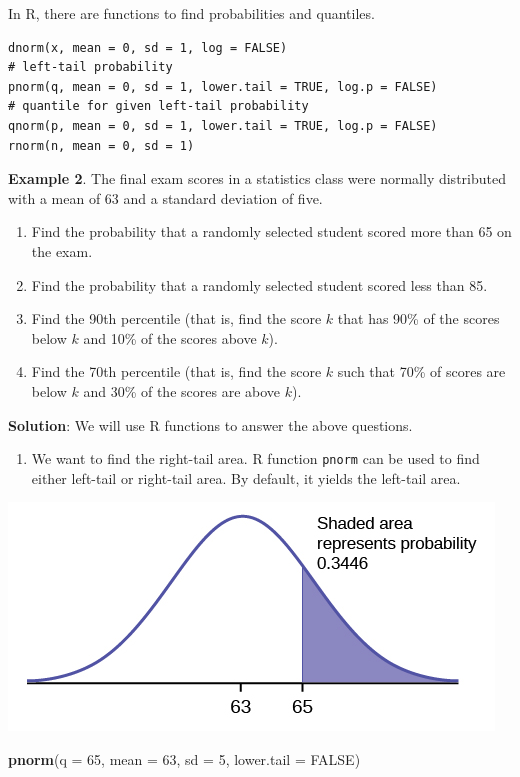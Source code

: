 \documentclass[
]{book}
\newenvironment{Shaded}{\begin{snugshade}}{\end{snugshade}}
\newcommand{\AttributeTok}[1]{\textcolor[rgb]{0.13,0.29,0.53}{#1}}
\newcommand{\ConstantTok}[1]{\textcolor[rgb]{0.56,0.35,0.01}{#1}}
\newcommand{\DecValTok}[1]{\textcolor[rgb]{0.00,0.00,0.81}{#1}}
\newcommand{\FunctionTok}[1]{\textcolor[rgb]{0.13,0.29,0.53}{\textbf{#1}}}
\newcommand{\NormalTok}[1]{#1}
\providecommand{\tightlist}{%
  \setlength{\itemsep}{0pt}\setlength{\parskip}{0pt}}
\begin{document}
In R, there are functions to find probabilities and quantiles.

\begin{verbatim}
dnorm(x, mean = 0, sd = 1, log = FALSE)
# left-tail probability
pnorm(q, mean = 0, sd = 1, lower.tail = TRUE, log.p = FALSE)   
# quantile for given left-tail probability
qnorm(p, mean = 0, sd = 1, lower.tail = TRUE, log.p = FALSE)   
rnorm(n, mean = 0, sd = 1)
\end{verbatim}

\textbf{Example 2}. The final exam scores in a statistics class were normally distributed with a mean of 63 and a standard deviation of five.

\begin{enumerate}
\def\labelenumi{\arabic{enumi}.}
\item
  Find the probability that a randomly selected student scored more than 65 on the exam.
\item
  Find the probability that a randomly selected student scored less than 85.
\item
  Find the 90th percentile (that is, find the score \(k\) that has 90\% of the scores below \(k\) and 10\% of the scores above \(k\)).
\item
  Find the 70th percentile (that is, find the score \(k\) such that 70\% of scores are below \(k\) and 30\% of the scores are above \(k\)).
\end{enumerate}

\textbf{Solution}: We will use R functions to answer the above questions.

\begin{enumerate}
\def\labelenumi{\arabic{enumi}.}
\tightlist
\item
  We want to find the right-tail area. R function \texttt{pnorm} can be used to find either left-tail or right-tail area. By default, it yields the left-tail area.
\end{enumerate}

\begin{center}\includegraphics[width=0.4\linewidth]{topic03/exmple5-1} \end{center}

\begin{Shaded}
\begin{Highlighting}[]
\FunctionTok{pnorm}\NormalTok{(}\AttributeTok{q =} \DecValTok{65}\NormalTok{, }\AttributeTok{mean =} \DecValTok{63}\NormalTok{, }\AttributeTok{sd =} \DecValTok{5}\NormalTok{, }\AttributeTok{lower.tail =} \ConstantTok{FALSE}\NormalTok{)}
\end{Highlighting}
\end{Shaded}
\end{document}
